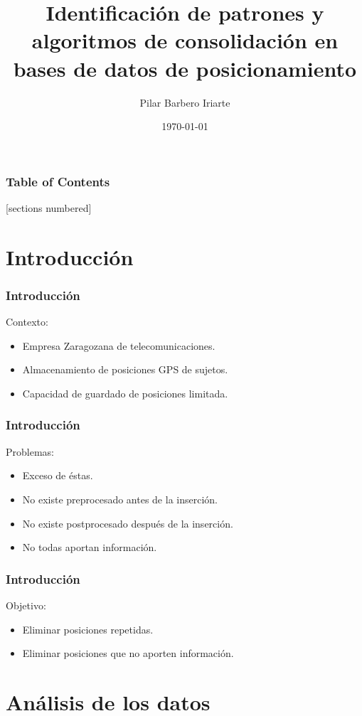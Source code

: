 \documentclass[10pt, spanish]{beamer}
\title{Identificaci\'on de patrones y algoritmos de consolidaci\'on en bases de datos de posicionamiento}
\date{\today}
\author{Pilar Barbero Iriarte}
\institute{Universidad de Zaragoza}
\begin{document}
\maketitle

\begin{frame}
  \frametitle{Table of Contents}
  [sections numbered]
  \tableofcontents[hideallsubsections]
\end{frame}

\section{Introducci\'on}

\begin{frame}[fragile]
\frametitle{Introducci\'on}
Contexto: 
\begin{itemize}
	\item Empresa Zaragozana de telecomunicaciones.
	\item Almacenamiento de posiciones GPS de sujetos.
	\item Capacidad de guardado de posiciones limitada.
\end{itemize}
\end{frame}


\begin{frame}[fragile]
\frametitle{Introducci\'on}
Problemas:
	\begin{itemize}
		\item Exceso de \'estas.
		\item No existe preprocesado antes de la inserci\'on.
		\item No existe postprocesado despu\'es de la inserci\'on.
		\item No todas aportan informaci\'on.
	\end{itemize}
\end{frame}

\begin{frame}[fragile]
  \frametitle{Introducci\'on}
  Objetivo:
  \begin{itemize}
  	  \item Eliminar posiciones repetidas.
  	  \item Eliminar posiciones que no aporten informaci\'on.
   \end{itemize}
\end{frame}

\section{An\'alisis de los datos}
\end{document}
